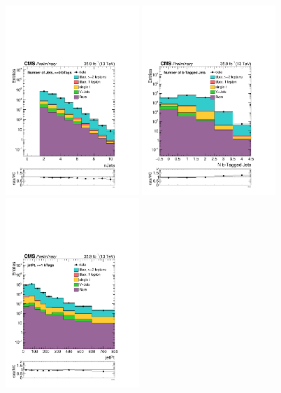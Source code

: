 \begin{figure}[htbp]
\centering
\includegraphics[width=0.45\textwidth]{figures/emuRegion_nJets.pdf}
\includegraphics[width=0.45\textwidth]{figures/emuRegion_nBtags.pdf}
\includegraphics[width=0.45\textwidth]{figures/emuRegion_jetPt.pdf}

\end{figure}
